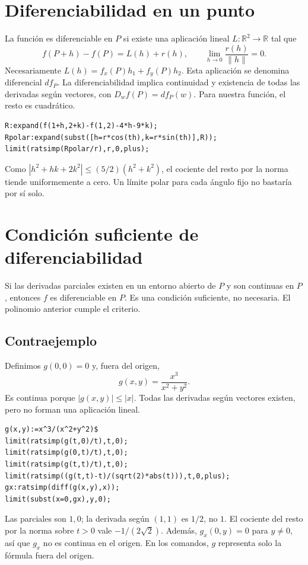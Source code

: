 \documentclass[12pt,a4paper]{article}
\begin{document}
\section{Diferenciabilidad en un punto}
La función es diferenciable en $P$ si existe una aplicación lineal $L:\mathbb R^2\to\mathbb R$ tal que
\[f(P+h)-f(P)=L(h)+r(h),\qquad \lim_{h\to0}\frac{r(h)}{\|h\|}=0.\]
Necesariamente $L(h)=f_x(P)h_1+f_y(P)h_2$. Esta aplicación se denomina diferencial $df_P$. La diferenciabilidad implica continuidad y existencia de todas las derivadas según vectores, con $D_wf(P)=df_P(w)$.
Para nuestra función, el resto es cuadrático.
\begin{lstlisting}
R:expand(f(1+h,2+k)-f(1,2)-4*h-9*k);
Rpolar:expand(subst([h=r*cos(th),k=r*sin(th)],R));
limit(ratsimp(Rpolar/r),r,0,plus);
\end{lstlisting}
Como $|h^2+hk+2k^2|\le(5/2)(h^2+k^2)$, el cociente del resto por la norma tiende uniformemente a cero. Un límite polar para cada ángulo fijo no bastaría por sí solo.
\section{Condición suficiente de diferenciabilidad}
Si las derivadas parciales existen en un entorno abierto de $P$ y son continuas en $P$, entonces $f$ es diferenciable en $P$. Es una condición suficiente, no necesaria. El polinomio anterior cumple el criterio.
\subsection*{Contraejemplo} Definimos $g(0,0)=0$ y, fuera del origen,
\[g(x,y)=\frac{x^3}{x^2+y^2}.\]
Es continua porque $|g(x,y)|\le |x|$. Todas las derivadas según vectores existen, pero no forman una aplicación lineal.
\begin{lstlisting}
g(x,y):=x^3/(x^2+y^2)$
limit(ratsimp(g(t,0)/t),t,0);
limit(ratsimp(g(0,t)/t),t,0);
limit(ratsimp(g(t,t)/t),t,0);
limit(ratsimp((g(t,t)-t)/(sqrt(2)*abs(t))),t,0,plus);
gx:ratsimp(diff(g(x,y),x));
limit(subst(x=0,gx),y,0);
\end{lstlisting}
Las parciales son $1,0$; la derivada según $(1,1)$ es $1/2$, no $1$. El cociente del resto por la norma sobre $t>0$ vale $-1/(2\sqrt2)$. Además, $g_x(0,y)=0$ para $y\ne0$, así que $g_x$ no es continua en el origen. En los comandos, $g$ representa solo la fórmula fuera del origen.
\end{document}
